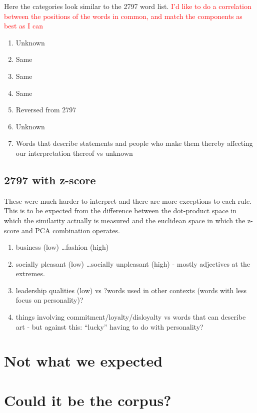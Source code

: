 \documentclass[10pt,letterpaper]{book}
\newcommand{\todo}[1]{\textcolor{red}{#1}}
\begin{document}
Here the categories look similar to the 2797 word list. \todo{I'd like to do a 
correlation between the positions of the words in common, and match the 
components as best as I can}

\begin{enumerate}
 \item Unknown
 \item Same
 \item Same
 \item Same
 \item Reversed from 2797
 \item Unknown
 \item Words that describe statements and people who make them thereby 
       affecting our interpretation thereof vs unknown
\end{enumerate}

\subsection{2797 with z-score}

These were much harder to interpret and there are more exceptions to each rule. 
This is to be expected from the difference between the dot-product space in 
which the similarity actually is measured and the euclidean space in which the 
z-score and PCA combination operates.

\begin{enumerate}
 \item business (low) \ldots fashion (high)
 \item socially pleasant (low) \ldots socially unpleasant (high) - mostly 
adjectives at the extremes.
 \item leadership qualities (low) vs ?words used in other contexts (words with 
less focus on personality)?
 \item things involving commitment/loyalty/disloyalty vs words that can 
describe art - but against this: ``lucky'' having to do with personality?
\end{enumerate}


\section{Not what we expected}

\section{Could it be the corpus?}
\end{document}
